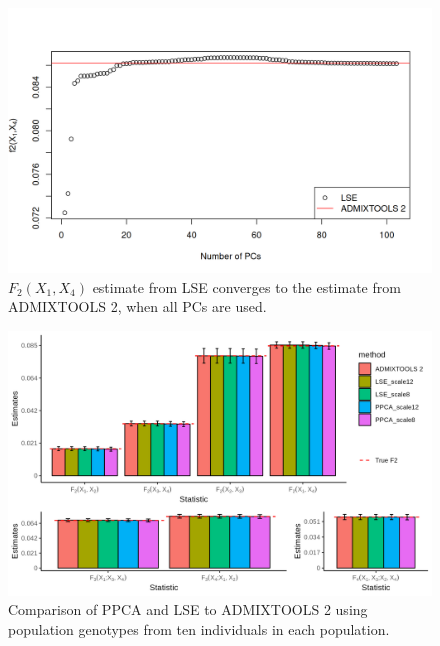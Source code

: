\documentclass[12pt, letterpaper]{article}
\begin{document}
\begin{figure}[ht!]
    \includegraphics[width=16.5cm]{plots/supplementary/lse_admix.png}
    \centering
    \caption{$F_2(X_1,X_4)$ estimate from LSE converges to the estimate from ADMIXTOOLS 2, when all PCs are used.}
    \label{figS1:pc_scale}
\end{figure}


\begin{figure}[ht!]
    \includegraphics[width=16.5cm]{plots/simfiles/Ne1000/split_times1000/npop10_nind100/plots_8_12/mu0.05_plot_all.png}
    \centering
    \caption{Comparison of PPCA and LSE to ADMIXTOOLS 2 using population genotypes from ten individuals in each population.}
    \label{figS2:pc_scale}
\end{figure}
\end{document}
